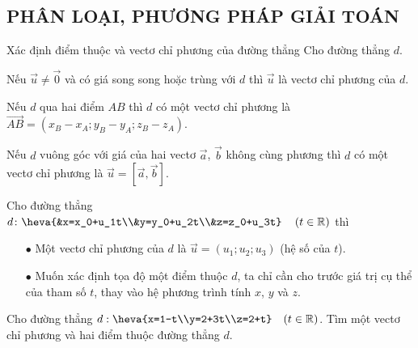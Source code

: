 \subsection{PHÂN LOẠI, PHƯƠNG PHÁP GIẢI TOÁN}
\begin{dang}{Xác định điểm thuộc và vectơ chỉ phương của đường thẳng}
	Cho đường thẳng $d$.
	\begin{listEX}[1]
		\item [\ding{172}] Nếu $\vec{u} \ne \vec{0}$ và có giá song song hoặc trùng với $d$ thì $\vec{u}$ là vectơ chỉ phương của $d$.
		\item [\ding{173}] Nếu $d$ qua hai điểm $AB$ thì $d$ có một vectơ chỉ phương là $\vec{AB}=\left(x_B-x_A; y_B-y_A;z_B-z_A \right)$. 
		\item [\ding{174}] Nếu $d$ vuông góc với giá của hai vectơ $\vec{a}$, $\vec{b}$ không cùng phương thì $d$ có một vectơ chỉ phương là $\vec{u}=[\vec{a},\vec{b}]$.
		\item [\ding{175}] Cho đường thẳng  $d \colon \heva{&x=x_0+u_1t\\&y=y_0+u_2t\\&z=z_0+u_3t} \quad \left( t \in \mathbb{R}\right)$ thì
		\begin{itemize}
			\item [$\bullet$] Một vectơ chỉ phương của $d$ là $\vec{u}=(u_1;u_2;u_3)$ (hệ số của $t$).
			\item [$\bullet$] Muốn xác định tọa độ một điểm thuộc $d$, ta chỉ cần cho trước giá trị cụ thể của tham số $t$, thay vào hệ phương trình tính $x$, $y$ và $z$.
		\end{itemize}
	\end{listEX}
\end{dang}
\setcounter{vd}{0}

\begin{vd}
	Cho đường thẳng $d:\heva{x=1-t\\y=2+3t\\z=2+t}\quad (t\in\mathbb{R})$. Tìm một vectơ chỉ phương và hai điểm thuộc đường thẳng $d$.
	\loigiai{
	}
\end{vd}


